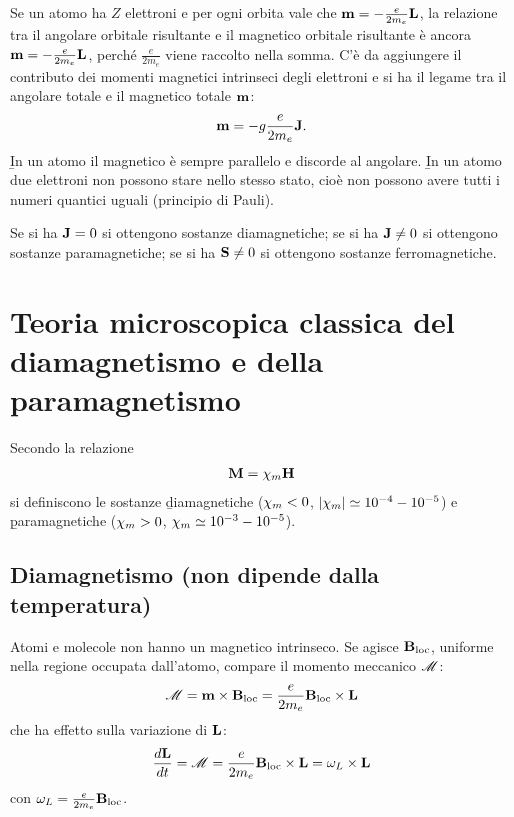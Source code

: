 Se un atomo ha $Z$ elettroni e per ogni orbita vale che $\m=-\frac{e}{2m_e}\L$, la relazione tra il \mom angolare orbitale risultante e il \mom magnetico orbitale risultante è ancora $\m=-\frac{e}{2m_e}\L$, perché $\frac{e}{2m_e}$ viene raccolto nella somma. C'è da aggiungere il contributo dei momenti magnetici intrinseci degli elettroni e si ha il legame tra il \mom angolare totale \dJ e il \mom magnetico totale $\m$:
\begin{equation}\begin{split}
\m=-g\frac{e}{2m_e}\bb{J}.
\end{split}\end{equation}
\b{In un atomo il \mom magnetico è sempre parallelo e discorde al \mom angolare}. \b{In un atomo due elettroni non possono stare nello stesso stato, cioè non possono avere tutti i numeri quantici uguali} (principio di Pauli).

Se si ha $\J=0$ si ottengono sostanze diamagnetiche; se si ha $\J\neq 0$ si ottengono sostanze paramagnetiche; se si ha $\S\neq 0$ si ottengono sostanze ferromagnetiche.

\section{Teoria microscopica classica del diamagnetismo e della paramagnetismo}%
Secondo la relazione
\begin{equation}\begin{split}
\M=\chim\H
\end{split}\end{equation}
si definiscono le sostanze \b{diamagnetiche} ($\chim<0$, $|\chim|\simeq10^{-4}-10^{-5}$) e \b{paramagnetiche} ($\chim>0$, $\chim\simeq10^{-3}-10^{-5}$).

\subsection{Diamagnetismo (non dipende dalla temperatura)}
Atomi e molecole non hanno un \mom magnetico intrinseco. Se agisce $\Bl$, uniforme nella regione occupata dall'atomo, compare il momento meccanico $\MM$:
\begin{equation}\begin{split}
\MM=\m\times\Bl=\frac{e}{2m_e}\Bl\times\L
\end{split}\end{equation}
che ha effetto sulla variazione di $\L$:
\begin{equation}\begin{split}
\frac{d\L}{dt}=\MM=\frac{e}{2m_e}\Bl\times\L=\o_L\times\L
\end{split}\end{equation}
con $\o_L=\frac{e}{2m_e}\Bl$.

